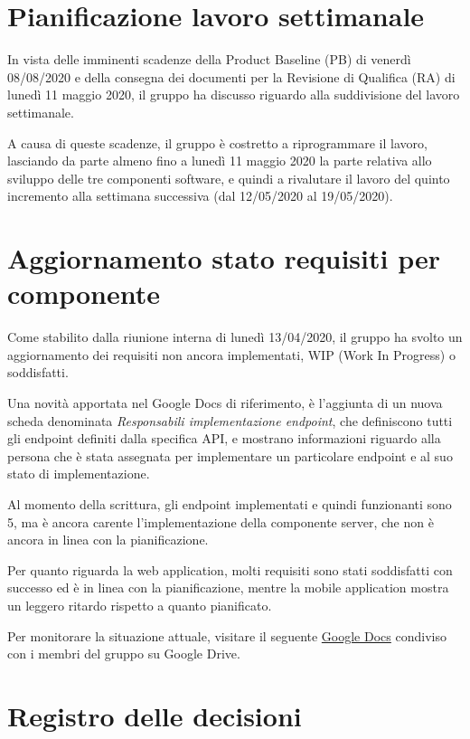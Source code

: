 \documentclass{article}
\begin{document}
\section{Pianificazione lavoro settimanale}%
\label{sec:pianificazione_lavoro_settimanale}
In vista delle imminenti scadenze della Product Baseline (PB) di venerdì 08/08/2020 e della consegna dei documenti per la Revisione di Qualifica (RA) di lunedì 11 maggio 2020, il gruppo ha discusso riguardo alla suddivisione del lavoro settimanale.

A causa di queste scadenze, il gruppo è costretto a riprogrammare il lavoro, lasciando da parte almeno fino a lunedì 11 maggio 2020 la parte relativa allo sviluppo delle tre componenti software, e quindi a rivalutare il lavoro del quinto incremento alla settimana successiva (dal 12/05/2020 al 19/05/2020).

\section{Aggiornamento stato requisiti per componente}%
\label{sec:aggiornamento_stato_requisiti_per_componente}
Come stabilito dalla riunione interna di lunedì 13/04/2020, il gruppo ha svolto un aggiornamento dei requisiti non ancora implementati, WIP (Work In Progress) o soddisfatti.

Una novità apportata nel Google Docs di riferimento, è l'aggiunta di un nuova scheda denominata \textit{Responsabili implementazione endpoint}, che definiscono tutti gli endpoint definiti dalla specifica API, e mostrano informazioni riguardo alla persona che è stata assegnata per implementare un particolare endpoint e al suo stato di implementazione.

Al momento della scrittura, gli endpoint implementati e quindi funzionanti sono 5, ma è ancora carente l'implementazione della componente server, che non è ancora in linea con la pianificazione.

Per quanto riguarda la web application, molti requisiti sono stati soddisfatti con successo ed è in linea con la pianificazione, mentre la mobile application mostra un leggero ritardo rispetto a quanto pianificato.

Per monitorare la situazione attuale, visitare il seguente \href{https://docs.google.com/spreadsheets/d/1J-RbNrb1yN_X1rVlKzpP9rjaiGst8B62k1K6EHY-grU/edit#gid=0}{Google Docs} condiviso con i membri del gruppo su Google Drive.

\newpage
\section{Registro delle decisioni}%
\label{sec:registro_delle_decisioni}
\end{document}
